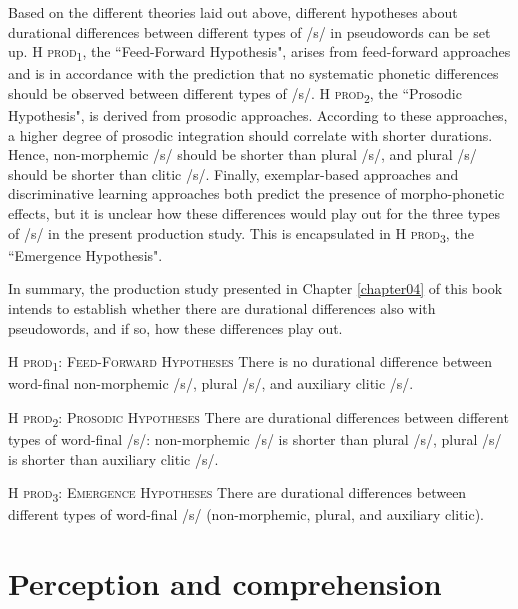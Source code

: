 Based on the different theories laid out above, different hypotheses about durational differences between different types of /s/ in pseudowords can be set up. \textsc{H prod\textsubscript{1}}, the ``Feed-Forward Hypothesis", arises from feed-forward approaches and is in accordance with the prediction that no systematic phonetic differences should be observed between different types of /s/. \textsc{H prod\textsubscript{2}}, the ``Prosodic Hypothesis", is derived from prosodic approaches. According to these approaches, a higher degree of prosodic integration should correlate with shorter durations. Hence, non-morphemic /s/ should be shorter than plural /s/, and plural /s/ should be shorter than clitic /s/. Finally, exemplar-based approaches and discriminative learning approaches both predict the presence of morpho-phonetic effects, but it is unclear how these differences would play out for the three types of /s/ in the present production study. This is encapsulated in \textsc{H prod\textsubscript{3}}, the ``Emergence Hypothesis". 

In summary, the production study presented in Chapter \ref{chapter04} of this book intends to establish whether there are durational differences also with pseudowords, and if so, how these differences play out.

\begin{description}
\item\textsc{H prod\textsubscript{1}}: \textsc{Feed-Forward Hypotheses} \newline
There is no durational difference between word-final non-morphemic /s/, plural /s/, and auxiliary clitic /s/.

\item\textsc{H prod\textsubscript{2}}: \textsc{Prosodic Hypotheses} \newline
There are durational differences between different types of word-final /s/: 
non-morphemic /s/ is shorter than plural /s/, plural /s/ is shorter than auxiliary clitic /s/.

\item\textsc{H prod\textsubscript{3}}: \textsc{Emergence Hypotheses} \newline
There are durational differences between different types of word-final /s/ (non-morphemic, plural, and auxiliary clitic).
\end{description}

\section{Perception and comprehension}\label{section02_2}

